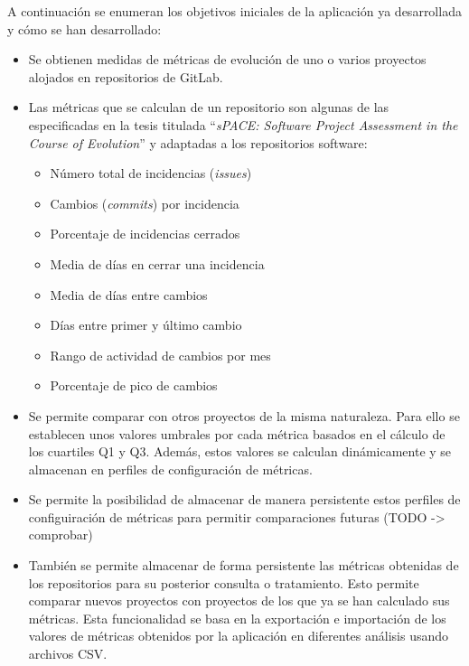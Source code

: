 A continuación se enumeran los objetivos iniciales de la aplicación ya desarrollada y cómo se han desarrollado: \cite{TFGPrevio}
\begin{itemize}
	\tightlist
	\item Se obtienen medidas de métricas de evolución de uno o varios proyectos alojados en repositorios de GitLab.
	\item Las métricas que se calculan de un repositorio  son algunas de las especificadas en la tesis titulada ``\textit{sPACE: Software Project Assessment in the Course of Evolution}'' \cite{ratzinger_space:_2007} y 
	adaptadas a los repositorios software:
	\begin{itemize}
		\tightlist
		\item Número total de incidencias (\textit{issues})
		\item Cambios (\textit{commits}) por incidencia
		\item Porcentaje de incidencias cerrados
		\item Media de días en cerrar una incidencia
		\item Media de días entre cambios
		\item Días entre primer y último cambio
		\item Rango de actividad de cambios por mes
		\item Porcentaje de pico de cambios
	\end{itemize}
	\item Se permite comparar con otros proyectos de la misma naturaleza. Para ello se establecen unos valores umbrales por cada métrica basados en el cálculo de los cuartiles Q1 y Q3. Además, estos valores se calculan dinámicamente y se almacenan en perfiles de configuración de métricas.
	\item Se permite la posibilidad de almacenar de manera persistente estos perfiles de configuiración de métricas para permitir comparaciones futuras (TODO -> comprobar)
	\item También se permite almacenar de forma persistente las métricas obtenidas de los repositorios para su posterior consulta o tratamiento. Esto permite comparar nuevos proyectos con proyectos de los que ya se han calculado sus métricas.
	 Esta funcionalidad se basa en la exportación e importación de los valores de métricas obtenidos por la aplicación en diferentes análisis usando archivos CSV.
\end{itemize}

\newpage


